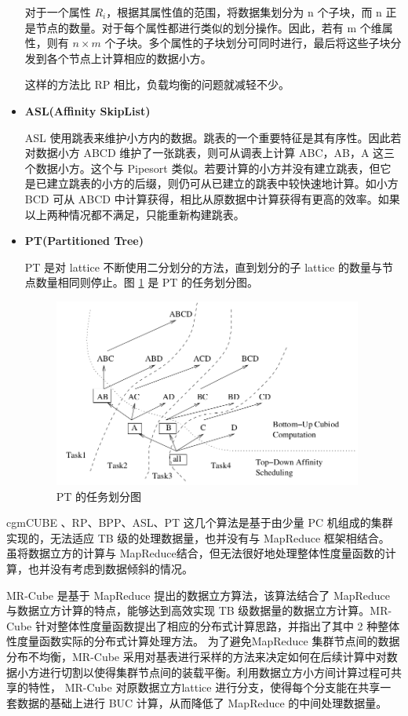 \begin{itemize}
对于一个属性 ${R}_{i}$，根据其属性值的范围，将数据集划分为 n 个子块，而 n 正是节点的数量。对于每个属性都进行类似的划分操作。因此，若有 m 个维属性，则有 $n \times m$ 个子块。多个属性的子块划分可同时进行，最后将这些子块分发到各个节点上计算相应的数据小方。

这样的方法比 RP 相比，负载均衡的问题就减轻不少。

\item \textbf{ASL(Affinity SkipList)}

ASL 使用跳表来维护小方内的数据。跳表的一个重要特征是其有序性。因此若对数据小方 ABCD 维护了一张跳表，则可从调表上计算 ABC，AB，A 这三个数据小方。这个与 Pipesort 类似。若要计算的小方并没有建立跳表，但它是已建立跳表的小方的后缀，则仍可从已建立的跳表中较快速地计算。如小方 BCD 可从 ABCD 中计算获得，相比从原数据中计算获得有更高的效率。如果以上两种情况都不满足，只能重新构建跳表。
 
\item \textbf{PT(Partitioned Tree)}

PT 是对 lattice 不断使用二分划分的方法，直到划分的子 lattice 的数量与节点数量相同则停止。图 \ref{cluster_pt} 是 PT 的任务划分图。

\begin{figure}[!htb]
\centering\includegraphics[width=4in]{picture/ch_current_research/cluster_pt} 
\caption{PT 的任务划分图}\label{cluster_pt} 
\end{figure} 

\end{itemize}


cgmCUBE \cite{dehne2006cgmcube}、RP、BPP、ASL、PT\cite{lee2012efficient} 这几个算法是基于由少量 PC 机组成的集群实现的，无法适应 TB 级的处理数据量，也并没有与 MapReduce 框架相结合。 \cite{you2008parallel} \cite{sergey2009applying} 虽将数据立方的计算与 MapReduce结合，但无法很好地处理整体性度量函数的计算，也并没有考虑到数据倾斜的情况。

MR-Cube \cite{nandi2011distributed} 是基于 MapReduce 提出的数据立方算法，该算法结合了 MapReduce 与数据立方计算的特点，能够达到高效实现 TB 级数据量的数据立方计算。MR-Cube 针对整体性度量函数提出了相应的分布式计算思路，并指出了其中 2 种整体性度量函数实际的分布式计算处理方法。 为了避免MapReduce 集群节点间的数据分布不均衡，MR-Cube 采用对基表进行采样的方法来决定如何在后续计算中对数据小方进行切割以使得集群节点间的装载平衡。利用数据立方小方间计算过程可共享的特性， MR-Cube 对原数据立方lattice 进行分支，使得每个分支能在共享一套数据的基础上进行 BUC 计算，从而降低了 MapReduce 的中间处理数据量。


